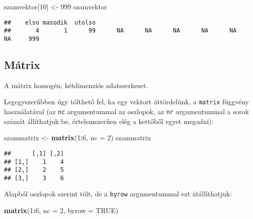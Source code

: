 \documentclass[
]{book}
\newenvironment{Shaded}{\begin{snugshade}}{\end{snugshade}}
\newcommand{\DataTypeTok}[1]{\textcolor[rgb]{0.13,0.29,0.53}{#1}}
\newcommand{\DecValTok}[1]{\textcolor[rgb]{0.00,0.00,0.81}{#1}}
\newcommand{\KeywordTok}[1]{\textcolor[rgb]{0.13,0.29,0.53}{\textbf{#1}}}
\newcommand{\NormalTok}[1]{#1}
\newcommand{\OperatorTok}[1]{\textcolor[rgb]{0.81,0.36,0.00}{\textbf{#1}}}
\newcommand{\OtherTok}[1]{\textcolor[rgb]{0.56,0.35,0.01}{#1}}
\newcommand{\StringTok}[1]{\textcolor[rgb]{0.31,0.60,0.02}{#1}}
\begin{document}
\begin{Shaded}
\begin{Highlighting}[]
\NormalTok{szamvektor[}\DecValTok{10}\NormalTok{] <-}\StringTok{ }\DecValTok{999}
\NormalTok{szamvektor}
\end{Highlighting}
\end{Shaded}

\begin{verbatim}
##    elso masodik  utolso                                                         
##       4       1      99      NA      NA      NA      NA      NA      NA     999
\end{verbatim}

\hypertarget{muxe1trix}{%
\subsection{Mátrix}\label{muxe1trix}}

A mátrix homogén, kétdimenziós adatszerkezet.

Legegyszerűbben úgy tölthető fel, ha egy vektort áttördelünk, a \texttt{matrix} függvény használatával (az \texttt{nc} argumentummal az oszlopok, az \texttt{nr} argumentummal a sorok számát állíthatjuk be, értelemszerűen elég a kettőből egyet megadni):

\begin{Shaded}
\begin{Highlighting}[]
\NormalTok{szammatrix <-}\StringTok{ }\KeywordTok{matrix}\NormalTok{(}\DecValTok{1}\OperatorTok{:}\DecValTok{6}\NormalTok{, }\DataTypeTok{nc =} \DecValTok{2}\NormalTok{)}
\NormalTok{szammatrix}
\end{Highlighting}
\end{Shaded}

\begin{verbatim}
##      [,1] [,2]
## [1,]    1    4
## [2,]    2    5
## [3,]    3    6
\end{verbatim}

Alapból oszlopok szerint tölt, de a \texttt{byrow} argumentummal ezt átállíthatjuk:

\begin{Shaded}
\begin{Highlighting}[]
\KeywordTok{matrix}\NormalTok{(}\DecValTok{1}\OperatorTok{:}\DecValTok{6}\NormalTok{, }\DataTypeTok{nc =} \DecValTok{2}\NormalTok{, }\DataTypeTok{byrow =} \OtherTok{TRUE}\NormalTok{)}
\end{Highlighting}
\end{Shaded}
\end{document}
